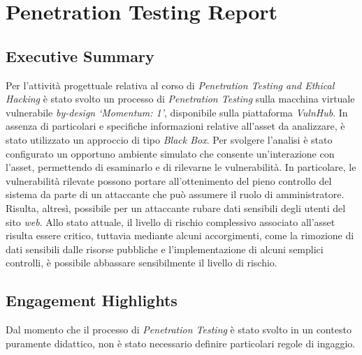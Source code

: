 \documentclass[a4paper,11pt,oneside,top=3cm,bottom=3cm,left=3.5cm,right=3.5cm,openright,reqno,table]{book}
\begin{document}


\frontmatter

\cleardoublepage



\mainmatter
\chapter{Penetration Testing Report}
\section{Executive Summary}
Per l'attività progettuale relativa al corso di \emph{Penetration Testing and Ethical Hacking} è stato svolto un processo di \emph{Penetration Testing} sulla macchina virtuale vulnerabile \emph{by-design} \emph{`Momentum: 1'}, disponibile sulla piattaforma \emph{VulnHub}. In assenza di particolari e specifiche informazioni relative all'asset da analizzare, è stato utilizzato un approccio di tipo \emph{Black Box}. Per svolgere l'analisi è stato configurato un opportuno ambiente simulato che consente un'interazione con l'asset, permettendo di esaminarlo e di rilevarne le vulnerabilità. In particolare, le vulnerabilità rilevate possono portare all'ottenimento del pieno controllo del sistema da parte di un attaccante che può assumere il ruolo di amministratore. Risulta, altresì, possibile per un attaccante rubare dati sensibili degli utenti del sito \emph{web}. Allo stato attuale, il livello di rischio complessivo associato all'asset risulta essere critico, tuttavia mediante alcuni accorgimenti, come la rimozione di dati sensibili dalle risorse pubbliche e l'implementazione di alcuni semplici controlli, è possibile abbassare sensibilmente il livello di rischio. 
\section{Engagement Highlights}
Dal momento che il processo di \emph{Penetration Testing} è stato svolto in un contesto puramente didattico, non è stato necessario definire particolari regole di ingaggio. 
\end{document}
